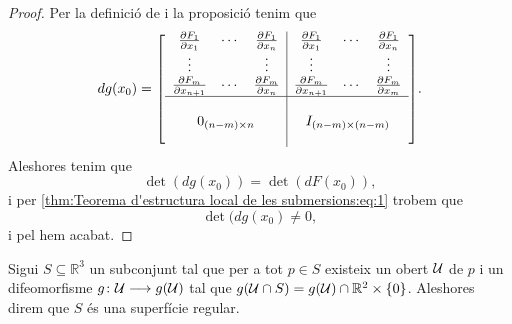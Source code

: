 \documentclass[../Apunts.tex]{subfiles}
\begin{document}
\begin{theorem}
\begin{proof}
			Per la definició de  i la proposició  tenim que
			\[dg(x_{0})=\left[\begin{array}{c|c}
				\begin{matrix}
					\frac{\partial F_{1}}{\partial x_{1}} & \cdots & \frac{\partial F_{1}}{\partial x_{n}} \\
					\vdots & & \vdots \\
					\frac{\partial F_{m}}{\partial x_{n+1}} & \cdots & \frac{\partial F_{m}}{\partial x_{n}}
				\end{matrix} & \begin{matrix}
					\frac{\partial F_{1}}{\partial x_{1}} & \cdots & \frac{\partial F_{1}}{\partial x_{n}} \\
					\vdots & & \vdots \\
					\frac{\partial F_{m}}{\partial x_{n+1}} & \cdots & \frac{\partial F_{m}}{\partial x_{m}}
				\end{matrix} \\ \hline \\
				0_{(n-m)\times n} & I_{(n-m)\times(n-m)} \\
				&
			\end{array}\right].\]
			Aleshores tenim que
			\[\det(dg(x_{0}))=\det(dF(x_{0})),\]
			i per \eqref{thm:Teorema d'estructura local de les submersions:eq:1} trobem que
			\[\det(dg(x_{0})\neq0,\]
			i pel  hem acabat.
		\end{proof}
	\end{theorem}
	\begin{definition}[Superfície]
		\label{def:superfície}
		Sigui \(S\subseteq\mathbb{R}^{3}\) un subconjunt tal que per a tot \(p\in S\) existeix un obert \(\mathcal{U}\) de \(p\) i un difeomorfisme \(g\colon\mathcal{U}\longrightarrow g(\mathcal{U})\) tal que \(g(\mathcal{U}\cap S)=g(\mathcal{U})\cap\mathbb{R}^{2}\times\{0\}\). Aleshores direm que \(S\) és una superfície regular.
	\end{definition}
\end{document}
